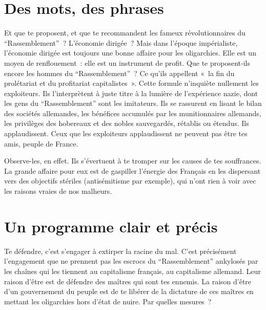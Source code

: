\documentclass[french,twoside]{book} %
\begin{document}
\section[Des mots, des phrases]{Des mots, des phrases}
\noindent Et que te proposent, et que te recommandent les fameux révolutionnaires du “Rassemblement” ? L’économie dirigée ? Mais dans l’époque impérialiste, l’économie dirigée est toujours une bonne affaire pour les oligarchies. Elle est un moyen de renflouement : elle est un instrument de profit. Que te proposent-ils encore les hommes du “Rassemblement” ? Ce qu’ils appellent « la fin du prolétariat et du profitariat capitalistes ». Cette formule n’inquiète nullement les exploiteurs. Ils l’interprètent à juste titre à la lumière de l’expérience nazie, dont les gens du “Rassemblement” sont les imitateurs. Ils se rassurent en lisant le bilan des sociétés allemandes, les bénéfices accumulés par les munitionnaires allemands, les privilèges des hobereaux et des nobles sauvegardés, rétablis ou étendus. Ils applaudissent. Ceux que les exploiteurs applaudissent ne peuvent pas être tes amis, peuple de France.\par
Observe-les, en effet. Ils s’évertuent à te tromper sur les causes de tes souffrances. La grande affaire pour eux est de gaspiller l’énergie des Français en les dispersant vers des objectifs stériles (antisémitisme par exemple), qui n’ont rien à voir avec les raisons vraies de nos malheurs.
\section[Un programme clair et précis]{Un programme clair et précis}
\noindent Te défendre, c’est s’engager à extirper la racine du mal. C’est précisément l’engagement que ne prennent pas les escrocs du “Rassemblement” ankylosés par les chaînes qui les tiennent au capitalisme français, au capitalisme allemand. Leur raison d’être est de défendre des maîtres qui sont tes ennemis. La raison d’être d’un gouvernement du peuple est de te libérer de la dictature de ces maîtres en mettant les oligarchies hors d’état de nuire. Par quelles mesures ?\par
\end{document}

